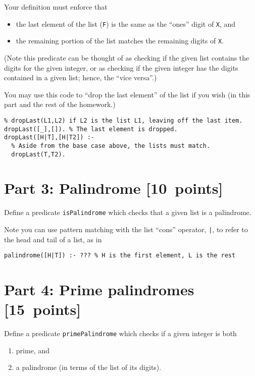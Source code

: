 \documentclass[11pt]{article}
\begin{document}
Your definition must enforce that
\begin{itemize}
\item the last element of the list (\texttt{F}) is the same
as the “ones” digit of \texttt{X}, and
\item the remaining portion of the list matches the remaining
digits of \texttt{X}.
\end{itemize}

(Note this predicate can be thought of as checking if the given list contains
the digits for the given integer, or as checking if the given integer
has the digits contained in a given list; hence, the “vice versa”.)

You may use this code to “drop the last element” of the list
if you wish (in this part and the rest of the homework.)
\begin{verbatim}
% dropLast(L1,L2) if L2 is the list L1, leaving off the last item.
dropLast([_],[]). % The last element is dropped.
dropLast([H|T],[H|T2]) :-
  % Aside from the base case above, the lists must match.
  dropLast(T,T2).
\end{verbatim}

\section*{Part 3: Palindrome                                     [10 points]}
\label{sec:org31fab3c}
Define a predicate \texttt{isPalindrome} which checks that a given
list is a palindrome.

Note you can use pattern matching with the list “cons” operator, \texttt{|},
to refer to the head and tail of a list, as in
\begin{verbatim}
palindrome([H|T]) :- ??? % H is the first element, L is the rest
\end{verbatim}

\section*{Part 4: Prime palindromes                              [15 points]}
\label{sec:org1d2ffb0}

Define a predicate \texttt{primePalindrome} which checks
if a given integer is both
\begin{enumerate}
\item prime, and
\item a palindrome (in terms of the list of its digits).
\end{enumerate}
\end{document}
